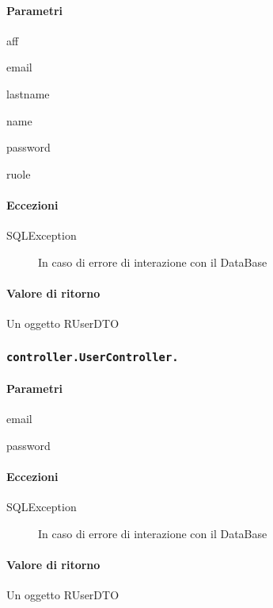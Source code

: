 \paragraph{Parametri}
\begin{description}
\item aff
\item email
\item lastname
\item name
\item password
\item ruole
\end{description}
\paragraph{Eccezioni}
\begin{description}
\item[SQLException] In caso di errore di interazione con il DataBase
\end{description}
\paragraph{Valore di ritorno}
Un oggetto RUserDTO

\subsubsection{\texttt{controller.UserController.}}

\paragraph{Parametri}
\begin{description}
\item email
\item password
\end{description}
\paragraph{Eccezioni}
\begin{description}
\item[SQLException] In caso di errore di interazione con il DataBase
\end{description}
\paragraph{Valore di ritorno}
Un oggetto RUserDTO

